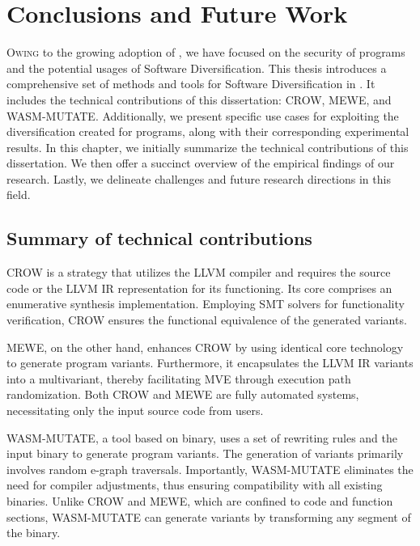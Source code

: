 
\chapter{Conclusions and Future Work}
\label{results}


\lettrine[lines=3]{O}{wing} to the growing adoption of \Wasm, we have focused on the security of \Wasm programs and the potential usages of Software Diversification.
This thesis introduces a comprehensive set of methods and tools for Software Diversification in \Wasm.
It includes the technical contributions of this dissertation: CROW, MEWE, and WASM-MUTATE.
Additionally, we present specific use cases for exploiting the diversification created for \Wasm programs, along with their corresponding experimental results.
In this chapter, we initially summarize the technical contributions of this dissertation.
We then offer a succinct overview of the empirical findings of our research.
Lastly, we delineate challenges and future research directions in this field.

\section{Summary of technical contributions}
CROW is a strategy that utilizes the LLVM compiler and requires the source code or the LLVM IR representation for its functioning. 
Its core comprises an enumerative synthesis implementation. 
Employing SMT solvers for functionality verification, CROW ensures the functional equivalence of the generated variants. 

MEWE, on the other hand, enhances CROW by using identical core technology to generate program variants. 
Furthermore, it encapsulates the LLVM IR variants into a \Wasm multivariant, thereby facilitating MVE through execution path randomization. 
Both CROW and MEWE are fully automated systems, necessitating only the input source code from users. 

WASM-MUTATE, a tool based on binary, uses a set of rewriting rules and the input \wasm binary to generate program variants. 
The generation of \Wasm variants primarily involves random e-graph traversals. 
Importantly, WASM-MUTATE eliminates the need for compiler adjustments, thus ensuring compatibility with all existing \Wasm binaries. 
Unlike CROW and MEWE, which are confined to code and function sections, WASM-MUTATE can generate variants by transforming any segment of the \wasm binary.

